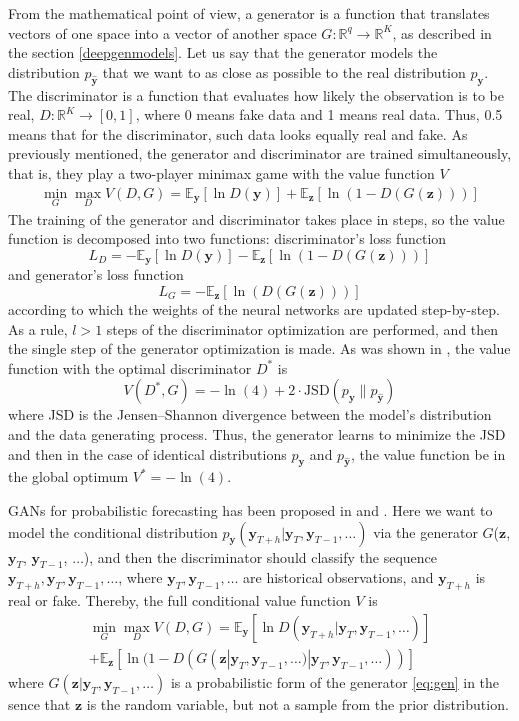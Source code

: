 \documentclass[12pt,a4paper]{article}
\begin{document}
From the mathematical point of view, a generator is a function that translates vectors of one space into a vector of another space $G: \mathbb R^q \to \mathbb R^K$, as described in the section \ref{deepgenmodels}. Let us say that the generator models the distribution $p_\mathbf{\hat y}$ that we want to as close as possible to the real distribution $p_\mathbf y$. The discriminator is a function that evaluates how likely the observation is to be real, $D: \mathbb R^K \to [0, 1]$, where 0 means fake data and 1 means real data. Thus, 0.5 means that for the discriminator, such data looks equally real and fake. As previously mentioned, the generator and discriminator are trained simultaneously, that is, they play a two-player minimax game with the value function $V$
$$\begin{aligned}
\min _{G} \max _{D} V(D, G) =\mathbb{E}_\mathbf{y}[\ln D(\mathbf{y})]+ \mathbb{E}_\mathbf{z}[\ln (1-D(G(\mathbf{z})))]
\end{aligned}$$
The training of the generator and discriminator takes place in steps, so the value function is decomposed into two functions: discriminator's loss function 
$$L_D = -\mathbb{E}_\mathbf{y}[\ln D(\mathbf{y})] - \mathbb{E}_{\mathbf{z}}[\ln (1-D(G(\mathbf{z})))]$$
and generator's loss function
$$L_G = -\mathbb{E}_{\mathbf{z}}[\ln (D(G(\mathbf{z})))]$$
according to which the weights of the neural networks are updated step-by-step. As a rule, $l>1$ steps of the discriminator optimization are performed, and then the single step of the generator optimization is made.  As was shown in \cite{goodfellow2014}, the value function with the optimal discriminator $D^*$ is 
$$V(D^*, G)=-\ln (4)+2 \cdot \text{JSD}(p_\mathbf{y} \| p_\mathbf{\hat y} )$$
where JSD is the Jensen–Shannon divergence between the model’s distribution and the data generating process. Thus, the generator learns to minimize the JSD and then in the case of identical distributions $p_\mathbf{y}$ and $p_\mathbf{\hat y}$, the value function be in the global optimum $V^* = - \ln (4)$.

GANs for probabilistic forecasting has been proposed in \cite{koshiyama2019generative} and \cite{koochali2020like}. Here we want to model the conditional distribution $p_\mathbf y(\mathbf y_{T+h}|\mathbf{y}_{T}, \mathbf{y}_{T-1}, \dots)$ via the generator $G$($\mathbf z$, $\mathbf{y}_{T}$, $\mathbf{y}_{T-1}$, $\dots$), and then the discriminator should classify the sequence $\mathbf y_{T+h}, \mathbf{y}_{T}, \mathbf{y}_{T-1}, \dots$, where $\mathbf{y}_{T}, \mathbf{y}_{T-1}, \dots$ are historical observations, and $\mathbf y_{T+h}$ is real or fake. Thereby, the full conditional value function $V$ is 
$$
\begin{aligned}
\min _{G} \max _{D} V(D, G) =\mathbb{E}_\mathbf{y}[\ln D(\mathbf y_{T+h} | \mathbf{y}_{T}, \mathbf{y}_{T-1}, \dots)]\\
+ \mathbb{E}_\mathbf{z}[\ln (1-D(G(\mathbf z | \mathbf{y}_{T}, \mathbf{y}_{T-1}, \dots) | \mathbf{y}_{T}, \mathbf{y}_{T-1}, \dots))]    
\end{aligned}
$$
where $G(\mathbf z | \mathbf{y}_{T}, \mathbf{y}_{T-1}, \dots)$ is a probabilistic form of the generator \eqref{eq:gen} in the sence that $\mathbf z$ is the random variable, but not a sample from the prior distribution.
\end{document}
